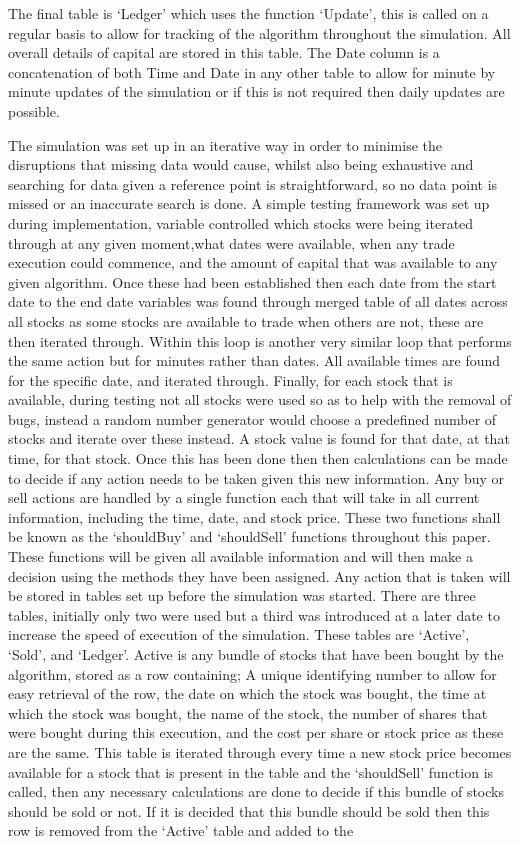 \documentclass[12pt,a4paper]{article}
\begin{document}
The final table is `Ledger' which uses the function `Update', this is called on a regular basis to allow for tracking of the algorithm throughout the simulation. All overall details of capital are stored in this table. The Date column is a concatenation of both Time and Date in any other table to allow for minute by minute updates of the simulation or if this is not required then daily updates are possible.

\iffalse
The simulation was set up in an iterative way in order to minimise the disruptions that missing data would cause, whilst also being exhaustive and searching for data given a reference point is straightforward, so no data point is missed or an inaccurate search is done. A simple testing framework was set up during implementation, variable controlled which stocks were being iterated through at any given moment,what dates were available, when any trade execution could commence, and the amount of capital that was available to any given algorithm. Once these had been established then each date from the start date to the end date variables was found through merged table of all dates across all stocks as some stocks are available to trade when others are not, these are then iterated through. Within this loop is another very similar loop that performs the same action but for minutes rather than dates. All available times are found for the specific date, and iterated through. Finally, for each stock that is available, during testing not all stocks were used so as to help with the removal of bugs, instead a random number generator would choose a predefined number of stocks and iterate over these instead. A stock value is found for that date, at that time, for that stock. Once this has been done then then calculations can be made to decide if any action needs to be taken given this new information. Any buy or sell actions are handled by a single function each that will take in all current information, including the time, date, and stock price. These two functions shall be known as the `shouldBuy' and `shouldSell' functions throughout this paper. These functions will be given all available information and will then make a decision using the methods they have been assigned. Any action that is taken will be stored in tables set up before the simulation was started. There are three tables, initially only two were used but a third was introduced at a later date to increase the speed of execution of the simulation. These tables are `Active', `Sold', and `Ledger'. Active is any bundle of stocks that have been bought by the algorithm, stored as a row containing; A unique identifying number to allow for easy retrieval of the row, the date on which the stock was bought, the time at which the stock was bought, the name of the stock, the number of shares that were bought during this execution, and the cost per share or stock price as these are the same. This table is iterated through every time a new stock price becomes available for a stock that is present in the table and the `shouldSell' function is called, then any necessary calculations are done to decide if this bundle of stocks should be sold or not. If it is decided that this bundle should be sold then this row is removed from the `Active' table and added to the 
\end{document}
